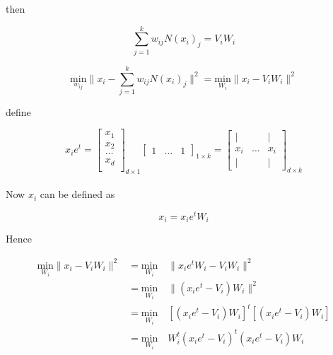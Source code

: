\documentclass[12pt,journal]{IEEEtran}
\begin{document}
    then
    
    \begin{equation*}
        \sum_{j=1}^k w_{ij} N(x_i)_j = V_i W_i
    \end{equation*}

    \begin{equation*}
            \underset{w_{ij}}{\text{min}} \lVert x_i - \sum_{j=1}^k w_{ij} N(x_i)_j \rVert^2
            = 
            \underset{W_i}{\text{min}} \lVert x_i - V_i W_i \rVert^2
    \end{equation*}

    define

    \[
        x_i e^t =
        \begin{bmatrix}
            x_1 \\
            x_2 \\
            \dots \\
            x_d \\
        \end{bmatrix}_{d \times 1}
        \begin{bmatrix}
            1 & \dots & 1
        \end{bmatrix}_{1 \times k}
        =
        \begin{bmatrix}
            |   &       & | \\
            x_i & \dots & x_i\\
            |   &       & |
        \end{bmatrix}_{d \times k}
    \]\\
    
    Now $x_i$ can be defined as

    \begin{equation*}
        x_i = x_i e^t W_i
    \end{equation*}

    Hence

    \begin{equation*}
        \begin{aligned}
            \underset{W_i}{\text{min}} \lVert x_i - V_i W_i \rVert^2
            &=
            \underset{W_i}{\text{min}} \quad \lVert x_i e^t W_i - V_i W_i \rVert^2\\
            &=
            \underset{W_i}{\text{min}} \quad \lVert (x_i e^t - V_i) W_i \rVert^2\\
            &=
            \underset{W_i}{\text{min}} \quad [(x_i e^t - V_i) W_i]^t [(x_i e^t - V_i) W_i]\\
            &=
            \underset{W_i}{\text{min}} \quad W_i^t(x_i e^t - V_i)^t (x_i e^t - V_i) W_i\\
        \end{aligned}
    \end{equation*}
\end{document}
